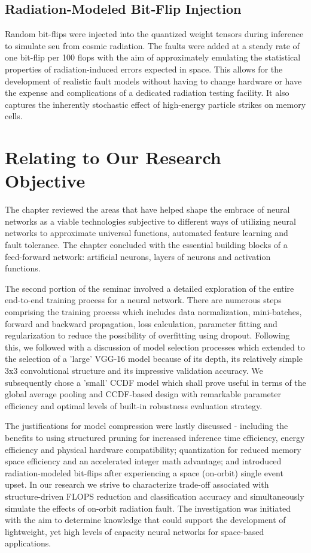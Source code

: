     \subsection{Radiation‐Modeled Bit‐Flip Injection}
    Random bit-flips were injected into the quantized weight tensors during inference to simulate \gls{seu} from cosmic radiation. The faults were added at a steady rate of one bit-flip per 100 \gls{flops} with the aim of approximately emulating the statistical properties of radiation-induced errors expected in space. This allows for the development of realistic fault models without having to change hardware or have the expense and complications of a dedicated radiation testing facility. It also captures the inherently stochastic effect of high-energy particle strikes on memory cells.











\section{Relating to Our Research Objective}
 The chapter reviewed the areas that have helped shape the embrace of neural networks as a viable technologies subjective to different ways of utilizing neural networks to approximate universal functions, automated feature learning and fault tolerance. The chapter concluded with the essential building blocks of a feed-forward network: artificial neurons, layers of neurons and activation functions.


The second portion of the seminar involved a detailed exploration of the entire end-to-end training process for a neural network. There are numerous steps comprising the training process which includes data normalization, mini-batches, forward and backward propagation, loss calculation, parameter fitting and regularization to reduce the possibility of overfitting using dropout. Following this, we followed with a discussion of model selection processes which extended to the selection of a 'large' VGG-16 model because of its depth, its relatively simple 3x3 convolutional structure and its impressive validation accuracy. We subsequently chose a 'small' CCDF model which shall prove useful in terms of the global average pooling and CCDF-based design with remarkable parameter efficiency and optimal levels of built-in robustness evaluation strategy. 


The justifications for model compression were lastly discussed - including the benefits to using structured pruning for increased inference time efficiency, energy efficiency and physical hardware compatibility; quantization for reduced memory space efficiency and an accelerated integer math advantage; and introduced radiation-modeled bit-flips after experiencing a space (on-orbit) single event upset. In our research we strive to characterize trade-off associated with structure-driven FLOPS reduction and classification accuracy and simultaneously simulate the effects of on-orbit radiation fault. The investigation was initiated with the aim to determine knowledge that could support the development of lightweight, yet high levels of capacity neural networks for space-based applications.
